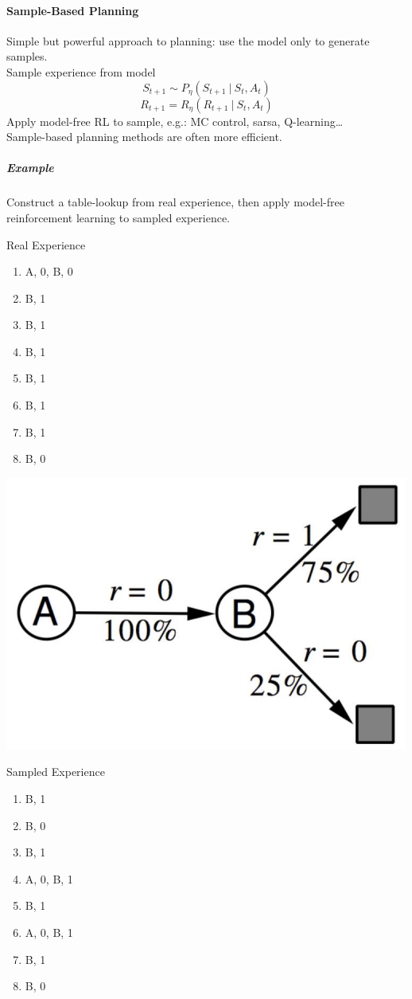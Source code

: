 \documentclass[10pt]{report}
\begin{document}
\paragraph{Sample-Based Planning} Simple but powerful approach to planning: use the model only to generate samples.\\
Sample experience from model
$$S_{t+1} \sim P_\eta(S_{t+1}\:|\:S_t,A_t)$$
$$R_{t+1} = R_\eta(R_{t+1}\:|\:S_t,A_t)$$
Apply model-free RL to sample, e.g.: MC control, sarsa, Q-learning\ldots\\
Sample-based planning methods are often more efficient.
\pagebreak
\subparagraph{Example} Construct a table-lookup from real experience, then apply model-free reinforcement learning to sampled experience.
\begin{multicols}{3}
Real Experience
\begin{enumerate}
	\item A, 0, B, 0
	\item B, 1
	\item B, 1
	\item B, 1
	\item B, 1
	\item B, 1
	\item B, 1
	\item B, 0
\end{enumerate}
\columnbreak
\begin{center}
	\includegraphics[scale=0.33]{174.png}
\end{center}
\columnbreak
Sampled Experience
\begin{enumerate}
	\item B, 1
	\item B, 0
	\item B, 1
	\item A, 0, B, 1
	\item B, 1
	\item A, 0, B, 1
	\item B, 1
	\item B, 0
\end{enumerate}
\end{multicols}
\end{document}
